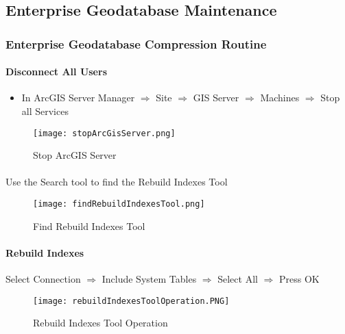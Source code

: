 \documentclass[class=article , crop=false, titlepage, twoside, multi={itemize, figure, verbatim}, float=false]{standalone}
\title{}  %
\begin{document}
\ifstandalone
\frontmatter %
\maketitle %
\tableofcontents %
\clearpage
\mainmatter %
\fi
\subsection{Enterprise Geodatabase Maintenance}
\subsubsection{Enterprise Geodatabase Compression Routine}
\paragraph[Disconnect Users]{Disconnect All Users\texorpdfstring{\\}{}}
\begin{itemize}
\item In ArcGIS Server Manager $\Rightarrow$  Site $\Rightarrow$ GIS Server $\Rightarrow$ Machines $\Rightarrow$ Stop all Services
\end{itemize}
\begin{figure}[h!]
\centering
    \texttt{[image: stopArcGisServer.png]}
\vspace*{-10mm}\caption{Stop ArcGIS Server}

\end{figure}
\clearpage
\paragraph*{}Use the Search tool to find the Rebuild Indexes Tool
\begin{figure}[h!]
\centering
    \texttt{[image: findRebuildIndexesTool.png]}
\vspace*{-10mm}\caption{Find Rebuild Indexes Tool}

\end{figure}
\clearpage
\paragraph[Rebuild Indexes]{Rebuild Indexes\texorpdfstring{\\}{}}
\noindent Select Connection $\Rightarrow$  Include System Tables $\Rightarrow$ Select All $\Rightarrow$ Press OK
\begin{figure}[h!]
\centering
	\texttt{[image: rebuildIndexesToolOperation.PNG]}
\caption{Rebuild Indexes Tool Operation}
\end{figure}
\clearpage
\end{document}
